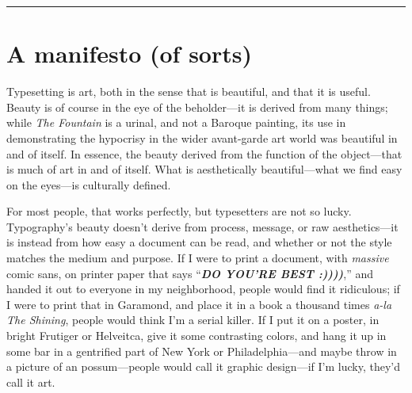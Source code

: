 \documentclass[%
	english,%
	 a4paper,%
	titlepage,%
	fleqn]{article}
\begin{document}
 

{
\hypersetup{linkcolor=black}
\setcounter{tocdepth}{3}
\tableofcontents
}

\noindent\rule{\linewidth}{0.05em}

\newpage









\section{A manifesto (of sorts)}\label{a-manifesto-of-sorts}

Typesetting is art, both in the sense that is beautiful, and that it is
useful. Beauty is of course in the eye of the beholder---it is derived
from many things; while \emph{The Fountain} is a urinal, and not a
Baroque painting, its use in demonstrating the hypocrisy in the wider
avant-garde art world was beautiful in and of itself. In essence, the
beauty derived from the function of the object---that is much of art in
and of itself. What is aesthetically beautiful---what we find easy on
the eyes---is culturally defined.

For most people, that works perfectly, but typesetters are not so lucky.
Typography's beauty doesn't derive from process, message, or raw
aesthetics---it is instead from how easy a document can be read, and
whether or not the style matches the medium and purpose. If I were to
print a document, with \emph{massive} comic sans, on printer paper that
says ``\textbf{\emph{DO YOU'RE BEST :))))}},'' and handed it out to
everyone in my neighborhood, people would find it ridiculous; if I were
to print that in Garamond, and place it in a book a thousand times
\emph{a-la The Shining}, people would think I'm a serial killer. If I
put it on a poster, in bright Frutiger or Helveitca, give it some
contrasting colors, and hang it up in some bar in a gentrified part of
New York or Philadelphia---and maybe throw in a picture of an
possum---people would call it graphic design---if I'm lucky, they'd call
it art.
\end{document}
